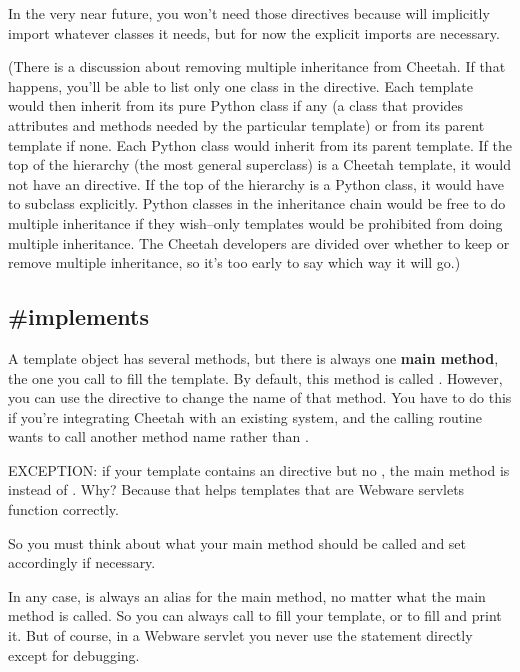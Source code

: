 In the very near future, you won't need those 
directives because  will implicitly import whatever 
classes it needs, but for now the explicit imports are necessary.

(There is a discussion about removing multiple inheritance from Cheetah.
If that happens, you'll be able to list only one class in the 
 directive.  Each template would then inherit from its
pure Python class if any (a class that provides attributes and methods
needed by the particular template) or from its parent template if none.
Each Python class would inherit from its parent template.  If the top of
the hierarchy (the most general superclass) is a Cheetah template, it would not
have an  directive.  If the top of the hierarchy is a Python
class, it would have to subclass  explicitly.
Python classes in the inheritance chain would be free to do multiple
inheritance if they wish--only templates would be prohibited from doing
multiple inheritance.  The Cheetah developers are divided over whether to keep
or remove multiple inheritance, so it's too early to say which way it will
go.)


\subsection{\#implements}
\label{inheritanceEtc.implements}


A template object has several methods, but there is always one {\bf main
method}, the one you call to fill the template.  By default, this method is
called .  However, you can use the 
directive to change the name of that method.  You have to do this if you're
integrating Cheetah with an existing system, and the calling routine wants to
call another method name rather than .

EXCEPTION: if your template contains an  directive but no
, the main method is  instead of
.  Why?  Because that helps templates that are Webware
servlets function correctly.

So you must think about what your main method should be called and set
 accordingly if necessary.

In any case,  is always an alias for the main method, no
matter what the main method is called.  So you can always call  to
fill your template, or  to fill and print it.  But of course, in
a Webware servlet you never use the  statement directly except for
debugging.


